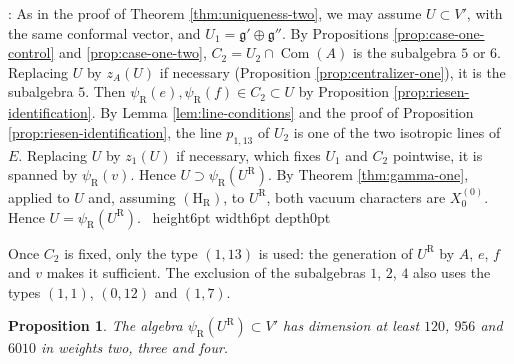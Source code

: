 \documentclass[leqno]{article}
\newcommand{\qed}{\hfill \vrule height6pt  width6pt depth0pt}
\newtheorem{prop}[thm]{Proposition}
\newenvironment{proof}[1][]{\noindent {\it Proof #1} : }{\hbox{~}\qed
\smallskip
}
\numberwithin{equation}{section}
\begin{document}
\begin{proof}
As in the proof of Theorem \ref{thm:uniqueness-two}, we may assume $U \subset V'$, with the same conformal vector, and $U_1 = \mathfrak g' \oplus \mathfrak g''$. By Propositions \ref{prop:case-one-control} and \ref{prop:case-one-two}, $C_2 = U_2 \cap \operatorname{Com}(A)$ is the subalgebra $5$ or $6$. Replacing $U$ by $z_A(U)$ if necessary (Proposition \ref{prop:centralizer-one}), it is the subalgebra $5$. Then $\psi_{\mathrm R}(e), \psi_{\mathrm R}(f) \in C_2 \subset U$ by Proposition \ref{prop:riesen-identification}. By Lemma \ref{lem:line-conditions} and the proof of Proposition \ref{prop:riesen-identification}, the line $p_{1,13}$ of $U_2$ is one of the two isotropic lines of $E$. Replacing $U$ by $z_1(U)$ if necessary, which fixes $U_1$ and $C_2$ pointwise, it is spanned by $\psi_{\mathrm R}(v)$. Hence $U \supset \psi_{\mathrm R}(U^{\mathrm R})$. By Theorem \ref{thm:gamma-one}, applied to $U$ and, assuming $\mathrm{(H_R)}$, to $U^{\mathrm R}$, both vacuum characters are $X^{(0)}_0$. Hence $U = \psi_{\mathrm R}(U^{\mathrm R})$.
\end{proof}

Once $C_2$ is fixed, only the type $(1,13)$ is used: the generation of $U^{\mathrm R}$ by $A$, $e$, $f$ and $v$ makes it sufficient. The exclusion of the subalgebras $1$, $2$, $4$ also uses the types $(1,1)$, $(0,12)$ and $(1,7)$.

\begin{prop}
\label{prop:riesen-dims}
The algebra $\psi_{\mathrm R}(U^{\mathrm R}) \subset V'$ has dimension at least $120$, $956$ and $6010$ in weights two, three and four.
\end{prop}
\end{document}
